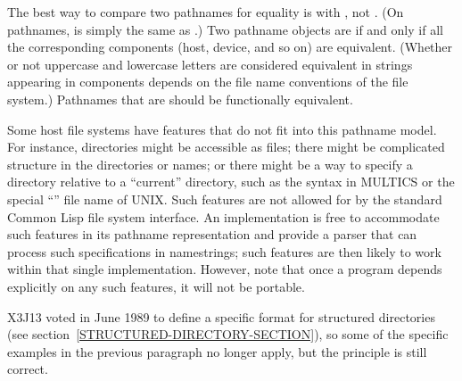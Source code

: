 
The best way to compare two pathnames for equality is with ,
not .
(On pathnames,  is simply the same as .)
Two pathname objects are  if and only if
all the corresponding components
(host, device, and so on) are equivalent.  (Whether or not
uppercase and lowercase letters are considered equivalent
in strings appearing in components depends on the file
name conventions of the file system.)  Pathnames
that are  should be functionally equivalent.

\begin{obsolete}
Some host file systems have features that do not fit into this pathname
model.  For instance, directories might be accessible as files; there
might be complicated structure in the directories or names; or there
might be a way to specify a directory relative to a
``current'' directory, such as the \cd{<} syntax in
{MULTICS} or the special ``'' file name of {UNIX}.  Such
features are not allowed for by the standard Common Lisp file system
interface.  An implementation is free to accommodate such features in its
pathname representation and provide a parser that can process such
specifications in namestrings; such features are then likely to work
within that single implementation.  However, note that once a program
depends explicitly on any such features, it will not be portable.
\end{obsolete}
\begin{newer}
X3J13 voted in June 1989 
to define a specific format for structured directories
(see section~\ref{STRUCTURED-DIRECTORY-SECTION}), so some of the specific
examples in the previous paragraph no longer apply, but the principle is
still correct.
\end{newer}

